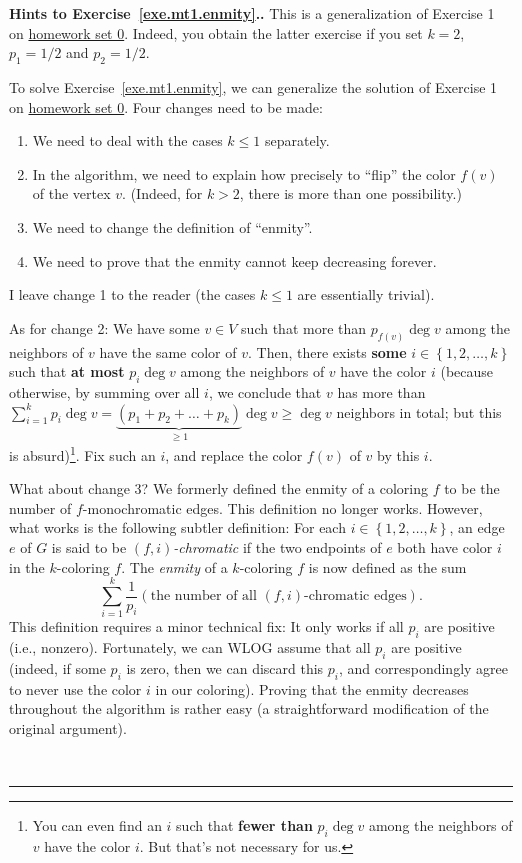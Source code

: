 \documentclass[numbers=enddot,12pt,final,onecolumn,notitlepage]{scrartcl}%
\newcounter{exer}
\theoremstyle{definition}
\newenvironment{proof}[1][Proof]{\noindent\textbf{#1.} }{\ \rule{0.5em}{0.5em}}
\let\sumnonlimits\sum
\renewcommand{\sum}{\sumnonlimits\limits}
\newcommand{\set}[1]{\left\{ #1 \right\}}
\newcommand{\tup}[1]{\left( #1 \right)}
\begin{document}
\begin{proof}[Hints to Exercise~\ref{exe.mt1.enmity}.]
This is a generalization of Exercise 1 on
\href{http://www-users.math.umn.edu/~dgrinber/5707s17/hw0s.pdf}{homework set 0}.
Indeed, you obtain the latter exercise if you set $k = 2$, $p_1 = 1/2$
and $p_2 = 1/2$.

To solve Exercise~\ref{exe.mt1.enmity}, we can generalize the solution
of Exercise 1 on
\href{http://www-users.math.umn.edu/~dgrinber/5707s17/hw0s.pdf}{homework set 0}.
Four changes need to be made:

\begin{enumerate}
\item We need to deal with the cases $k \leq 1$ separately.
\item In the algorithm, we need to explain how precisely to ``flip''
      the color $f\tup{v}$ of the vertex $v$. (Indeed, for $k > 2$,
      there is more than one possibility.)
\item We need to change the definition of ``enmity''.
\item We need to prove that the enmity cannot keep decreasing forever.
\end{enumerate}

I leave change 1 to the reader (the cases $k \leq 1$ are essentially
trivial).

As for change 2: We have some $v \in V$ such that more than
$p_{f\tup{v}} \deg v$ among the neighbors of $v$ have the same color
of $v$. Then, there exists \textbf{some} $i \in \set{1, 2, \ldots, k}$
such that \textbf{at most} $p_i \deg v$ among the neighbors of $v$
have the color $i$ (because otherwise, by summing over all $i$, we
conclude that $v$ has more than
$\sum_{i=1}^k p_i \deg v
= \underbrace{\tup{p_1+p_2+\ldots+p_k}}_{\geq 1} \deg v
\geq \deg v$ neighbors in total; but this is absurd)\footnote{You can
even find an $i$ such that \textbf{fewer than} $p_i \deg v$ among the
neighbors of $v$ have the color $i$. But that's not necessary for
us.}. Fix such an $i$,
and replace the color $f \tup{v}$ of $v$ by this $i$.

What about change 3? We formerly defined the enmity of a coloring $f$
to be the number of $f$-monochromatic edges. This definition no longer
works. However, what works is the following subtler definition: For
each $i \in \set{1, 2, \ldots, k}$, an edge $e$ of $G$ is said to be
\textit{$\tup{f, i}$-chromatic} if the two endpoints of $e$ both have
color $i$ in the $k$-coloring $f$. The \textit{enmity} of a
$k$-coloring $f$ is now defined as the sum
\[
\sum_{i=1}^k \dfrac{1}{p_i} \tup{ \text{the number of all }
                                  \tup{f, i}\text{-chromatic edges} }.
\]
This definition requires a minor technical fix: It only works if all
$p_i$ are positive (i.e., nonzero). Fortunately, we can WLOG assume
that all $p_i$ are positive (indeed, if some $p_i$ is zero, then
we can discard this $p_i$, and correspondingly agree to never use the
color $i$ in our coloring). Proving that the enmity decreases
throughout the algorithm is rather easy (a straightforward
modification of the original argument).


\end{proof}
\end{document}
